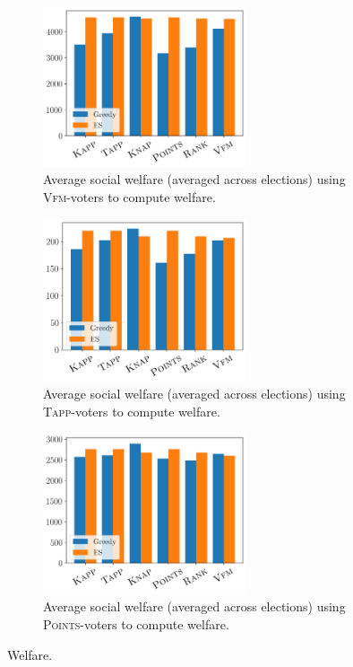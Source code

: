 \documentclass[runningheads]{llncs}
\newcommand{\points}{\textsc{Points}}
\newcommand{\vfm}{\textsc{Vfm}}
\newcommand{\tapp}{\textsc{Tapp}}
\begin{document}
\begin{figure}[ht]
     \hfill
     \begin{subfigure}[b]{0.45\textwidth}
         \centering
\includegraphics[width=6cm]{experiment/Ranking_value_money_welfare.png}
\caption{Average social welfare (averaged across elections) using \vfm{}-voters to compute welfare.
}\label{fig:vfm_welfare}
     \end{subfigure}
     \begin{subfigure}[b]{0.45\textwidth}
         \centering
\includegraphics[width=6cm]{experiment/Threshold_welfare.png}
\caption{Average social welfare (averaged across elections) using \tapp{}-voters to compute welfare.
}\label{fig:tapp_welfare}
     \end{subfigure}
     \hfill
     \begin{subfigure}[b]{0.45\textwidth}
         \centering
\includegraphics[width=6cm]{experiment/Utilities_welfare.png}
\caption{Average social welfare (averaged across elections) using \points{}-voters to compute welfare.
}\label{fig:util_welfare}
     \end{subfigure}
     

        \caption{Welfare.}
        \label{fig:entropy:app}
\end{figure}

\end{document}
